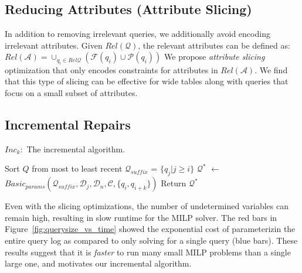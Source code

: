 \subsection{Reducing Attributes (Attribute Slicing)}

In addition to removing irrelevant queries, we additionally avoid encoding irrelevant attributes.
Given $Rel\mathcal{(Q)}$, the relevant attributes can be defined as:
$Rel\mathcal{(A)} = \cup_{q_i \in Rel\mathcal{Q}} (\mathcal{F}(q_i)\cup \mathcal{P}(q_i))$
We propose \emph{attribute slicing} optimization that only encodes constraints for attributes in $Rel\mathcal{(A)}$.
We find that this type of slicing can be effective for wide tables along with queries that focus on a small subset of attributes. 


\subsection{Incremental Repairs}\label{sec:incremental}

\begin{algorithm}[t]
\caption{$Inc_k:$ The incremental algorithm. 
}
\scriptsize
\label{alg:incalg}
\begin{algorithmic}[2]
\STATE Sort $Q$ from most to least recent
  \STATE $\mathcal{Q}_{suffix}$ = $\{q_j | j \ge i \}$ %
  \STATE $\mathcal{Q}^*$ $\leftarrow$ $Basic_{params}(\mathcal{Q}_{suffix}, \mathcal{D}_j, \mathcal{D}_n, \mathcal{C}, \{q_i, q_{i+k}\})$
    \STATE Return $\mathcal{Q}^*$
  \ENDIF
\ENDFOR
\end{algorithmic}
\end{algorithm}

Even with the slicing optimizations, the number of undetermined variables can remain high, resulting in slow runtime for the MILP solver.  
The red bars in Figure~\ref{fig:querysize_vs_time} showed the exponential cost of parameterizin the entire query log as compared to only solving for a single query (blue bars).
These results suggest that it is \emph{faster} to run many small MILP problems than a single large one, and motivates our incremental algorithm.


